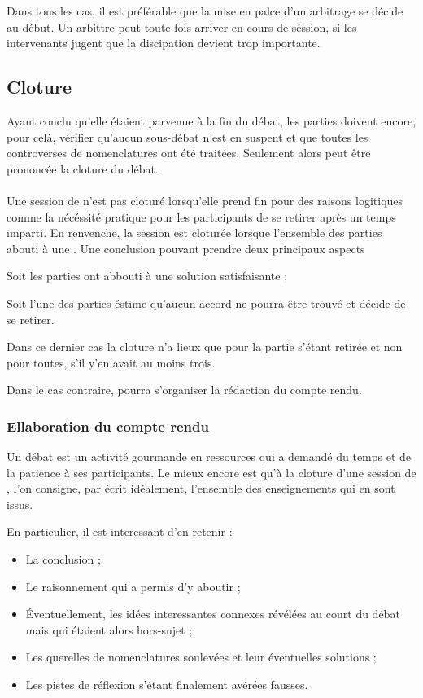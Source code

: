 Dans tous les cas, il est préférable que la mise en palce d’un arbitrage se décide au début. Un arbittre peut toute fois arriver en cours de séssion, si les intervenants jugent que la discipation devient trop importante.

\subsection{Cloture}

Ayant conclu qu’elle étaient parvenue à la fin du débat, les parties doivent encore, pour celà, vérifier qu’aucun sous-débat n’est en suspent et que toutes les controverses de nomenclatures ont été traitées. Seulement alors peut être prononcée la cloture du débat.

\paragraph{}
Une session de \mainabbr{} n’est pas cloturé lorsqu’elle prend fin pour des raisons logitiques comme la nécéssité pratique pour les participants de se retirer après un temps imparti. En renvenche, la session est cloturée lorsque l’ensemble des parties abouti à une . Une conclusion pouvant prendre deux principaux aspects
\begin{SRlist}
  \item Soit les parties ont abbouti à une solution satisfaisante ;
  \item Soit l’une des parties éstime qu’aucun accord ne pourra être trouvé et décide de se retirer.
\end{SRlist}
Dans ce dernier cas la cloture n’a lieux que pour la partie s’étant retirée et non pour toutes, s’il y’en avait au moins trois.

Dans le cas contraire, pourra s’organiser la rédaction du compte rendu.

\subsubsection{Ellaboration du compte rendu}
Un débat est un activité gourmande en ressources qui a demandé du temps et de la patience à ses participants. Le mieux encore est qu’à la cloture d’une session de \mainabbr{}, l’on consigne, par écrit idéalement, l’ensemble des enseignements qui en sont issus.

En particulier, il est interessant d’en retenir :
\begin{itemize}
   \item La conclusion ;
   \item Le raisonnement qui a permis d’y aboutir ;
   \item Éventuellement, les idées interessantes connexes révélées au court du débat mais qui étaient alors hors-sujet ;
   \item Les querelles de nomenclatures soulevées et leur éventuelles solutions ;
   \item Les pistes de réflexion s’étant finalement avérées fausses.
\end{itemize}

